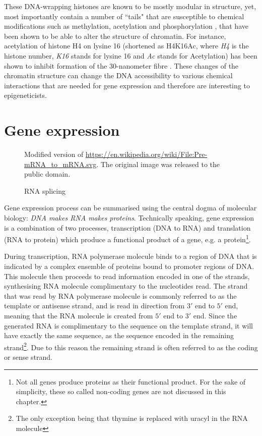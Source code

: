 \documentclass[parskip]{cs4rep}
\newcommand{\histonemodification}[1]{#1}
\begin{document}
These DNA-wrapping histones are known to be mostly modular in structure, yet, most importantly contain a number of ``tails" that are susceptible to chemical modifications such as methylation, acetylation and phosphorylation \cite{Fischle:2003tl,Kouzarides:2007js}, that have been shown to be able to alter the structure of chromatin. For instance, acetylation of histone H4 on lysine 16 (shortened as \histonemodification{H4K16Ac}, where \emph{H4} is the histone number, \emph{K16} stands for lysine 16 and \emph{Ac} stands for Acetylation) has been shown to inhibit formation of the 30-nanometer fibre \cite{ShogrenKnaak:2006gt}. These changes of the chromatin structure can change the DNA accessibility to various chemical interactions that are needed for gene expression and therefore are interesting to epigeneticists. 

\section{Gene expression}
\begin{figure}[t]
\centering
{}
{\centering Modified version of \url{https://en.wikipedia.org/wiki/File:Pre-mRNA_to_mRNA.svg}. The original image was released to the public domain.}
\caption{RNA splicing}
\label{fig:background:splicing}
\end{figure}

Gene expression process can be summarised using the central dogma of molecular biology: 
\emph{DNA makes RNA makes proteins}. Technically speaking, gene expression is a combination of two processes, transcription (DNA to RNA) and
translation (RNA to protein) which produce a functional product of a gene, e.g. a protein\footnote{Not all genes produce proteins as their functional product. For the sake of simplicity, these so called non-coding genes are not discussed in this chapter.}.

During transcription, RNA polymerase molecule binds to a region of DNA that is indicated by a complex ensemble of proteins bound to promoter regions of DNA. This molecule then proceeds to read information encoded in one of the strands, synthesising RNA molecule complimentary to the nucleotides read. The strand that was read by RNA polymerase molecule is commonly referred to as the template or antisense strand, and is read in direction from $3'$ end to $5'$ end, meaning that the RNA molecule is created from $5'$ end to $3'$ end. Since the generated RNA is complimentary to the sequence on the template strand, it will have exactly the same sequence, as the sequence encoded in the remaining strand\footnote{The only exception being that thymine is replaced with uracyl in the RNA molecule}. Due to this reason the remaining strand is often referred to as the coding or sense strand.
\end{document}
